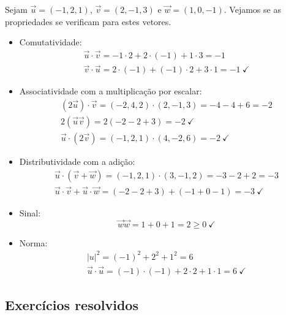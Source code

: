 \begin{ex}
  Sejam $\vec{u}=(-1,2,1)$, $\vec{v}=(2,-1,3)$ e $\vec{w}=(1,0,-1)$. Vejamos se as propriedades se verificam para estes vetores.
  \begin{itemize}
  \item Comutatividade:
    \begin{gather}
      \vec{u}\cdot\vec{v} = -1\cdot 2 + 2\cdot (-1) + 1\cdot 3 = -1\\
      \vec{v}\cdot\vec{u} = 2\cdot(-1) + (-1)\cdot 2 + 3\cdot 1 = -1~\checkmark
    \end{gather}
  \item Associatividade com a multiplicação por escalar:
    \begin{gather}
      (2\vec{u})\cdot\vec{v} = (-2,4,2)\cdot(2,-1,3) = -4-4+6=-2\\
      2(\vec{u}\vec{v}) = 2(-2-2+3) = -2~\checkmark\\
      \vec{u}\cdot(2\vec{v}) = (-1,2,1)\cdot(4,-2,6) = -2~\checkmark
    \end{gather}
  \item Distributividade com a adição:
    \begin{gather}
      \vec{u}\cdot(\vec{v}+\vec{w}) = (-1,2,1)\cdot(3,-1,2) = -3-2+2=-3\\
      \vec{u}\cdot\vec{v}+\vec{u}\cdot\vec{w} = (-2-2+3)+(-1+0-1) = -3~\checkmark
    \end{gather}
  \item Sinal:
    \begin{equation}
      \vec{w}\vec{w} = 1+0+1 = 2 \geq 0~\checkmark
    \end{equation}
  \item Norma:
    \begin{gather}
      |u|^2 = (-1)^2+2^2+1^2 = 6\\
      \vec{u}\cdot\vec{u} = (-1)\cdot(-1)+2\cdot 2+1\cdot 1 = 6~\checkmark
    \end{gather}
  \end{itemize}
\end{ex}

\subsection*{Exercícios resolvidos}

